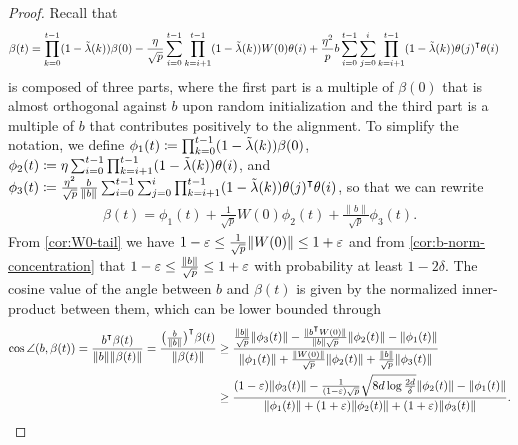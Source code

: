 \begin{proof}
    Recall that
    \begin{align*}
        \beta(t) &= \prod_{k=0}^{t-1}(1-\tlam(k))\beta(0) - \frac{\eta}{\sqrt p}\sum_{i=0}^{t-1} \prod_{k=i+1}^{t-1}(1-\tlam(k))W(0)\theta(i) + \frac{\eta^2}{p}b\sum_{i=0}^{t-1}\sum_{j=0}^i\prod_{k=i+1}^{t-1}(1-\tlam(k))\theta(j)\transpose\theta(i)
    \end{align*}
    is composed of three parts, where the first part is a multiple of $\beta(0)$ that is almost orthogonal against $b$ upon random initialization and the third part is a multiple of $b$ that contributes positively to the alignment. To simplify the notation, we define $\phi_{1}(t) \coloneqq \prod_{k=0}^{t-1}(1-\tilde{\lambda}(k))\beta(0)$, $\phi_{2}(t) \coloneqq \eta\sum_{i=0}^{t-1} \prod_{k=i+1}^{t-1} (1-\tilde{\lambda}(k))\theta(i)$, and $\phi_{3}(t) \defeq \frac{\eta^2}{\sqrt p} \frac{b}{\|b\|} \sum_{i=0}^{t-1} \sum_{j=0}^i \prod_{k=i+1}^{t-1}(1-\tlam(k)) \theta(j)\transpose\theta(i)$, so that we can rewrite 
    \begin{align*}
        \beta(t) = \phi_{1}(t) + \frac{1}{\sqrt p}W(0) \phi_{2}(t) + \frac{\|b\|}{\sqrt p}\phi_{3}(t).
    \end{align*}
    From \cref{cor:W0-tail} we have $1-\varepsilon\leq \frac{1}{\sqrt p} \|W(0)\| \leq 1+\varepsilon$ and from \cref{cor:b-norm-concentration} that $1-\varepsilon \leq \frac{\|b\|}{\sqrt p} \leq 1+\varepsilon$ with probability at least $1-2\delta$. The cosine value of the angle between $b$ and $\beta(t)$ is given by the normalized inner-product between them, which can be lower bounded through
    \begin{align*}
        \cos\angle(b, \beta(t)) 
        = \frac{b\transpose \beta(t)}{\|b\|\|\beta(t)\|}  = \frac{\big(\frac{b}{\|b\|}\big)\transpose \beta(t)}{\|\beta(t)\|} & \geq \frac{\frac{\|b\|}{\sqrt p}\|\phi_{3}(t)\|-\frac{\|b\transpose W(0)\|}{\|b\|\sqrt p}\|\phi_{2}(t)\| - \|\phi_{1}(t)\|}{\|\phi_{1}(t)\|+\frac{\|W(0)\|}{\sqrt p}\|\phi_{2}(t)\|+\frac{\|b\|}{\sqrt p}\|\phi_{3}(t)\|} \\
        & \geq \frac{(1-\eps)\|\phi_{3}(t)\|-\frac{1}{(1-\eps)\sqrt{p}} \sqrt{8d\log\frac{2d}{\delta}} \|\phi_{2}(t)\| - \|\phi_{1}(t)\|}{\|\phi_{1}(t)\|+(1+\eps)\|\phi_{2}(t)\|+(1+\eps)\|\phi_{3}(t)\|}.
    \end{align*}


\end{proof}

